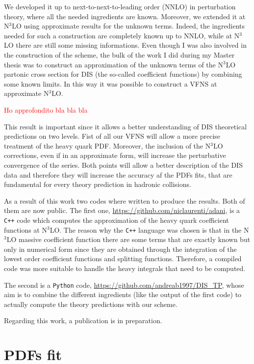 \documentclass[11pt,a4paper]{moderncv}        %
\begin{document}
We developed it up to next-to-next-to-leading order (NNLO) in perturbation theory, where all the needed ingredients are known.
Moreover, we extended it at N$^3$LO using approximate results for the unknown terms.
Indeed, the ingredients needed for such a construction are completely known up to NNLO, while at N$^3$LO
there are still some missing informations.
Even though I was also involved in the construction of the scheme, the bulk of the work I did during my Master thesis was to
construct an approximation of the unknown terms of the N$^3$LO partonic cross section for DIS (the so-called coefficient functions) by
combining some known limits.
In this way it was possible to construct a VFNS at approximate N$^3$LO.

\textcolor{red}{Ho approfondito bla bla bla}

This result is important since it allows a better understanding of DIS theoretical predictions on two levels.
Fist of all our VFNS will allow a more precise treatment of the heavy quark PDF.
Moreover, the inclusion of the N$^3$LO corrections, even if in an approximate form, will increase the perturbative convergence of the series.
Both points will allow a better description of the DIS data
and therefore they will increase the accuracy af the PDFs fits, that are fundamental for every theory prediction in hadronic collisions.

As a result of this work two codes where written to produce the results.
Both of them are now public.
The first one, \url{https://github.com/niclaurenti/adani}, is a \texttt{C++} code 
which computes the approximation of the heavy quark coefficient functions at N$^3$LO.
The reason why the \texttt{C++} language was chosen is that in the N$^3$LO massive coefficient function there are some terms that are
exactly known but only in numerical form since they are obtained through the integration of the lowest order coefficient functions and
splitting functions.
Therefore, a compiled code was more suitable to handle the heavy integrals that need to be computed.

The second is a \texttt{Python} code, \url{https://github.com/andreab1997/DIS_TP}, whose aim is to combine the different ingredients 
(like the output of the first code) to actually
compute the theory predictions with our scheme.

Regarding this work, a publication is in preparation.

\section{PDFs fit}
\end{document}
